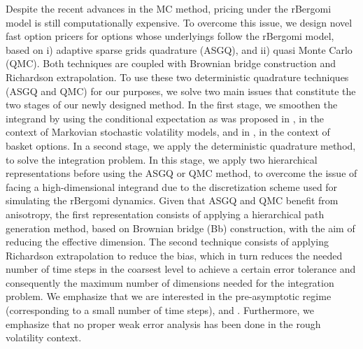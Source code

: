 Despite the recent advances in the MC method, pricing under the rBergomi model is still computationally expensive. To overcome this issue,  we design  novel fast option pricers  for options whose underlyings follow the rBergomi model,  based on i) adaptive sparse grids quadrature (ASGQ), and ii) quasi Monte Carlo (QMC). Both techniques are coupled with Brownian bridge construction and Richardson extrapolation.  To use these two deterministic quadrature techniques (ASGQ and QMC) for our purposes, we  solve two main issues that constitute the two stages of our newly designed method. In the first stage, we smoothen the integrand by using the conditional expectation as was proposed in \cite{romano1997contingent}, in the context of Markovian stochastic volatility  models, and in \cite{bayersmoothing}, in the context of basket options.   In a second stage, we apply the deterministic quadrature method, to solve the integration problem. In this stage, we apply two hierarchical representations before using the ASGQ or QMC method, to overcome the issue of facing a high-dimensional integrand due to the discretization scheme used for simulating the rBergomi dynamics. Given that ASGQ and QMC benefit from anisotropy, the first representation consists of applying a hierarchical  path generation method, based on Brownian
bridge (Bb) construction, with the aim of reducing the effective dimension. The second technique consists of applying Richardson extrapolation to reduce the bias, which in turn reduces the needed number of time steps in the coarsest level to achieve a certain error tolerance and consequently  the maximum number of dimensions needed for the integration problem. We emphasize that we are interested in  the pre-asymptotic regime (corresponding to a small number of time steps), and . Furthermore, we emphasize that no proper weak error analysis has been done in the rough volatility context.

